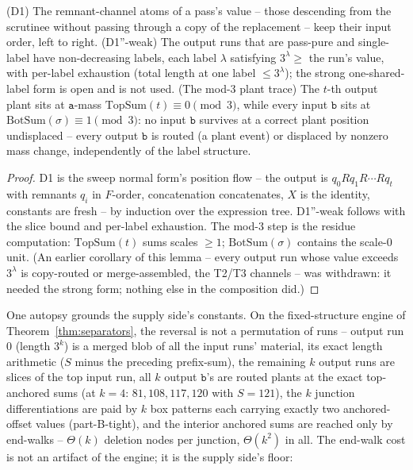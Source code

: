 \documentclass[runningheads,envcountsect]{llncs}
\begin{document}
\begin{lemma}
    \label{dich:lem:trace}
    (D1) The remnant-channel atoms of a pass's value -- those descending from the scrutinee without passing through a copy of the replacement -- keep their input order, left to right. (D1\textup{''}-weak) The output runs that are pass-pure and single-label have non-decreasing labels, each label $\lambda$ satisfying $3^{\lambda} \ge$ the run's value, with per-label exhaustion (total length at one label $\le 3^{\lambda}$); the strong one-shared-label form is open and is not used. (The mod-$3$ plant trace) The $t$-th output plant sits at $\mathtt a$-mass $\mathrm{TopSum}(t) \equiv 0 \pmod 3$, while every input $\mathtt b$ sits at $\mathrm{BotSum}(\sigma) \equiv 1 \pmod 3$: no input $\mathtt b$ survives at a correct plant position undisplaced -- every output $\mathtt b$ is routed (a plant event) or displaced by nonzero mass change, independently of the label structure.
\end{lemma}

\begin{proof}
    D1 is the sweep normal form's position flow -- the output is $q_0 R q_1 R \cdots R q_t$ with remnants $q_i$ in $F$-order, concatenation concatenates, $X$ is the identity, constants are fresh -- by induction over the expression tree. D1\textup{''}-weak follows with the slice bound and per-label exhaustion. The mod-$3$ step is the residue computation: $\mathrm{TopSum}(t)$ sums scales $\ge 1$; $\mathrm{BotSum}(\sigma)$ contains the scale-$0$ unit. (An earlier corollary of this lemma -- every output run whose value exceeds $3^{\lambda}$ is copy-routed or merge-assembled, the T2/T3 channels -- was withdrawn: it needed the strong form; nothing else in the composition did.)
\end{proof}

\noindent One autopsy grounds the supply side's constants. On the fixed-structure engine of Theorem~\ref{thm:separators}, the reversal is not a permutation of runs -- output run $0$ (length $3^{k}$) is a merged blob of all the input runs' material, its exact length arithmetic ($S$ minus the preceding prefix-sum), the remaining $k$ output runs are slices of the top input run, all $k$ output $\mathtt b$'s are routed plants at the exact top-anchored sums (at $k = 4$: $81, 108, 117, 120$ with $S = 121$), the $k$ junction differentiations are paid by $k$ box patterns each carrying exactly two anchored-offset values (part-B-tight), and the interior anchored sums are reached only by end-walks -- $\Theta(k)$ deletion nodes per junction, $\Theta(k^{2})$ in all. The end-walk cost is not an artifact of the engine; it is the supply side's floor:
\end{document}
